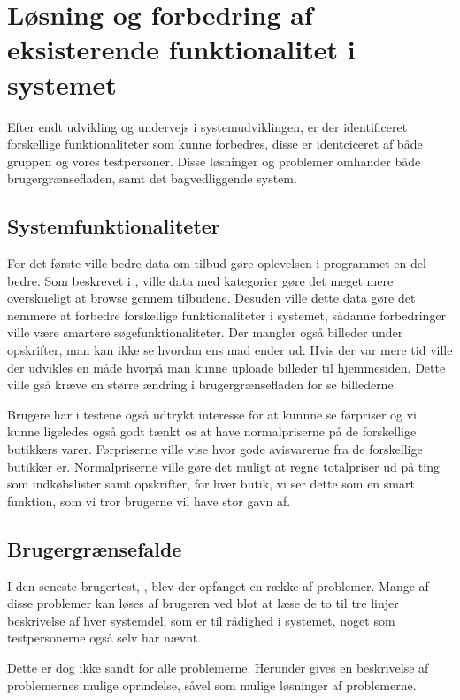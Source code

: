 \section{Løsning og forbedring af eksisterende funktionalitet i systemet}
Efter endt udvikling og undervejs i systemudviklingen, er der identificeret forskellige funktionaliteter som kunne forbedres, disse er identciceret af både gruppen og vores testpersoner.
Disse løsninger og problemer omhander både brugergrænsefladen, samt det bagvedliggende system.

\subsection{Systemfunktionaliteter}
For det første ville bedre data om tilbud gøre oplevelsen i programmet en del bedre.
Som beskrevet i , ville data med kategorier gøre det meget mere overskueligt at browse gennem tilbudene.
Desuden ville dette data gøre det nemmere at forbedre forskellige funktionaliteter i systemet, sådanne forbedringer ville være smartere søgefunktionaliteter.
Der mangler også billeder under opskrifter, man kan ikke se hvordan ens mad ender ud.
Hvis der var mere tid ville der udvikles en måde hvorpå man kunne uploade billeder til hjemmesiden. 
Dette ville gså kræve en større ændring i brugergrænsefladen for se billederne.

Brugere har i testene også udtrykt interesse for at kunnne se førpriser og vi kunne ligeledes også godt tænkt os at have normalpriserne på de forskellige butikkers varer.
Førpriserne ville vise hvor gode avisvarerne fra de forskellige butikker er.
Normalpriserne ville gøre det muligt at regne totalpriser ud på ting som indkøbslister samt opskrifter, for hver butik, vi ser dette som en smart funktion, som vi tror brugerne vil have stor gavn af.

\subsection{Brugergrænsefalde}
I den seneste brugertest, , blev der opfanget en række af problemer.
Mange af disse problemer kan løses af brugeren ved blot at læse de to til tre linjer beskrivelse af hver systemdel, som er til rådighed i systemet, noget som testpersonerne også selv har nævnt.

Dette er dog ikke sandt for alle problemerne.
Herunder gives en beskrivelse af problemernes mulige oprindelse, såvel som mulige løsninger af problemerne.

